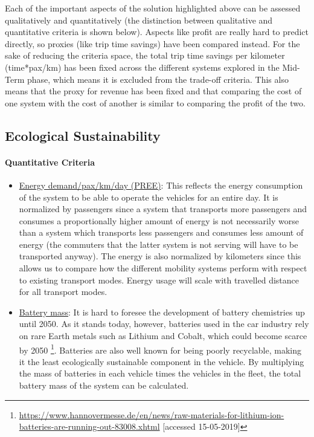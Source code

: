 Each of the important aspects of the solution highlighted above can be assessed qualitatively and quantitatively (the distinction between qualitative and quantitative criteria is shown below). Aspects like profit are really hard to predict directly, so proxies (like trip time savings) have been compared instead. For the sake of reducing the criteria space, the total trip time savings per kilometer (time*pax/km) has been fixed across the different systems explored in the Mid-Term phase, which means it is excluded from the trade-off criteria. This also means that the proxy for revenue has been fixed and that comparing the cost of one system with the cost of another is similar to comparing the profit of the two.

\subsection{Ecological Sustainability}

\paragraph{Quantitative Criteria}

\begin{itemize}
    \item \underline{Energy demand/pax/km/day (PREE)}: This reflects the energy consumption of the system to be able to operate the vehicles for an entire day. It is normalized by passengers since a system that transports more passengers and consumes a proportionally higher amount of energy is not necessarily worse than a system which transports less passengers and consumes less amount of energy (the commuters that the latter system is not serving will have to be transported anyway). The energy is also normalized by kilometers since this allows us to compare how the different mobility systems perform with respect to existing transport modes. Energy usage will scale with travelled distance for all transport modes.  %
    \item \underline{Battery mass}: It is hard to foresee the development of battery chemistries up until 2050. As it stands today, however, batteries used in the car industry rely on rare Earth metals such as Lithium and Cobalt, which could become scarce by 2050 \footnote{\url{https://www.hannovermesse.de/en/news/raw-materials-for-lithium-ion-batteries-are-running-out-83008.xhtml} [accessed 15-05-2019]}. Batteries are also well known for being poorly recyclable, making it the least ecologically sustainable component in the vehicle. By multiplying the mass of batteries in each vehicle times the vehicles in the fleet, the total battery mass of the system can be calculated.
    
\end{itemize}


